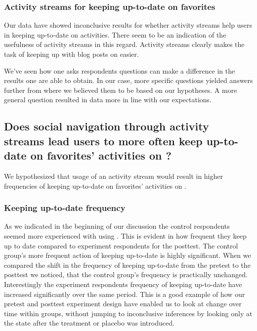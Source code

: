 \subsubsection{Activity streams for keeping up-to-date on favorites}

Our data have showed inconclusive results for whether activity
streams help users in keeping up-to-date on activities. There seem to be an
indication of the usefulness of activity streams in this regard.
Activity streams clearly makes the task of keeping up with blog posts on
\urort{} easier.

We've seen how
one asks respondents questions can make a difference in the results one
are able to obtain. In our case, more specific questions yielded answers
further from where we believed them to be based on our hypotheses. A more
general question resulted in data more in line with our expectations.

\subsection{%
  Does social navigation through activity streams lead users to more often keep
  up-to-date on favorites' activities on \urort{}?
}

We hypothesized that usage of an activity stream would result in higher
frequencies of keeping up-to-date on favorites' activities on \urort{}.

\subsubsection{Keeping up-to-date frequency}

As we indicated in the beginning of our discussion the control respondents
seemed more experienced with using \urort{}. This is evident in how
frequent they keep up to date compared to experiment respondents for the
posttest.%
The control group's more frequent action of keeping up-to-date is highly
significant. When we compared the shift in the frequency of keeping up-to-date
from the pretest to the posttest%
we noticed, that the control group's frequency is practically unchanged.
Interestingly the experiment respondents frequency of keeping up-to-date have
increased significantly over the same period. This is a good example
of how our pretest and posttest experiment design have enabled us to look
at change over time within groups, without jumping to inconclusive inferences
by looking only at the state after the treatment or placebo was introduced.

